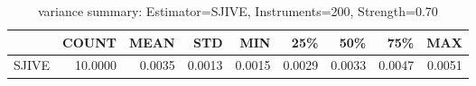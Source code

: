 \begin{table}[ht]
\centering
\caption{variance summary: Estimator=SJIVE, Instruments=200, Strength=0.70}
\begin{tabular}{lrrrrrrrr}
\toprule
 & COUNT & MEAN & STD & MIN & 25\% & 50\% & 75\% & MAX \\
\midrule
SJIVE & 10.0000 & 0.0035 & 0.0013 & 0.0015 & 0.0029 & 0.0033 & 0.0047 & 0.0051 \\
\bottomrule
\end{tabular}
\end{table}
